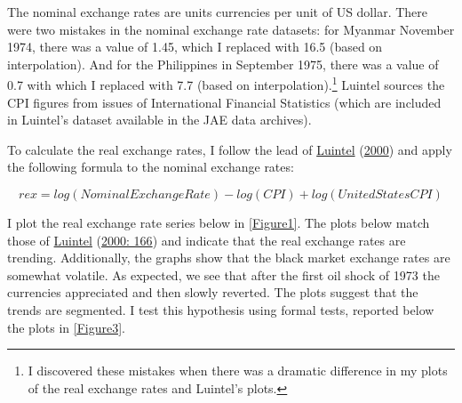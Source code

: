 \documentclass[11pt,preprint, authoryear]{elsarticle}
\numberwithin{equation}{section}
\numberwithin{figure}{section}
\numberwithin{table}{section}
\let\rmarkdownfootnote\footnote%
\def\footnote{\protect\rmarkdownfootnote}
\begin{document}
The nominal exchange rates are units currencies per unit of US dollar.
There were two mistakes in the nominal exchange rate datasets: for
Myanmar November 1974, there was a value of 1.45, which I replaced with
16.5 (based on interpolation). And for the Philippines in September
1975, there was a value of 0.7 with which I replaced with 7.7 (based on
interpolation).\footnote{I discovered these mistakes when there was a
  dramatic difference in my plots of the real exchange rates and
  Luintel's plots.} Luintel sources the CPI figures from issues of
International Financial Statistics (which are included in Luintel's
dataset available in the JAE data archives).

To calculate the real exchange rates, I follow the lead of
\protect\hyperlink{ref-Kul}{Luintel} (\protect\hyperlink{ref-Kul}{2000})
and apply the following formula to the nominal exchange rates:

\[
rex = log(Nominal Exchange Rate) - log(CPI) + log(United States CPI)
\]

I plot the real exchange rate series below in \ref{Figure1}. The plots
below match those of \protect\hyperlink{ref-Kul}{Luintel}
(\protect\hyperlink{ref-Kul}{2000: 166}) and indicate that the real
exchange rates are trending. Additionally, the graphs show that the
black market exchange rates are somewhat volatile. As expected, we see
that after the first oil shock of 1973 the currencies appreciated and
then slowly reverted. The plots suggest that the trends are segmented. I
test this hypothesis using formal tests, reported below the plots in
\ref{Figure3}.
\end{document}
